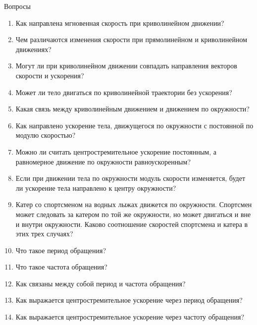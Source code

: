 \documentclass[a5paper, 10pt]{diss_4}
\renewcommand{\'}{\,'}
\begin{document}
\begin{center}
   Вопросы
\end{center}
\begin{enumerate}
\item Как   направлена   мгновенная   скорость при криволинейном движении?
\item Чем различаются  изменения скорости при прямолинейном и криволинейном движениях?
\item Могут ли  при  криволинейном движении   совпадать   направления   векторов   скорости и ускорения?
\item Может   ли   тело   двигаться   по   криволинейной траектории без ускорения?
\item Какая    связь    между    криволинейным движением    и    движением    по   окружности?
\item Как направлено ускорение тела,  движущегося   по   окружности   с   постоянной   по модулю скоростью?
\item Можно ли считать центростремительное  ускорение  постоянным,  а  равномерное движение     по     окружности     равноускоренным?
\item Если   при   движении   тела   по   окружности   модуль   скорости   изменяется,   будет ли    ускорение   тела    направлено    к    центру окружности?
\item Катер со спортсменом на водных лыжах движется по окружности. Спортсмен может следовать за катером по той же окружности, но может двигаться и вне и внутри окружности. Каково соотношение скоростей спортсмена и катера в этих трех случаях?
\item Что такое период обращения?
\item Что такое частота обращения?
\item Как  связаны  между  собой   период  и частота обращения?
\item Как выражается центростремительное ускорение через период обращения?
\item Как выражается центростремительное ускорение через частоту обращения?
\end{enumerate}
\end{document}
